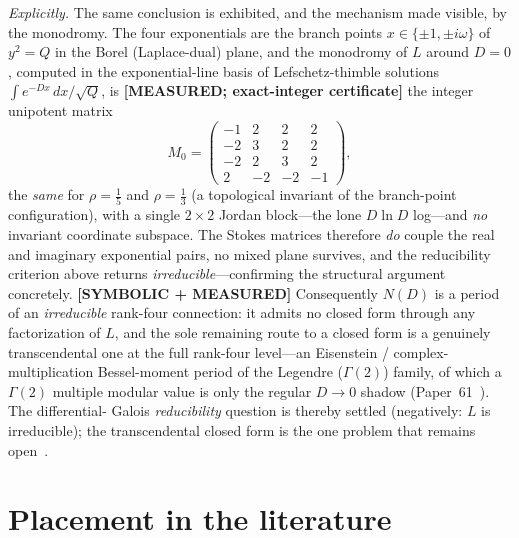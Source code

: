 \documentclass[aps,pra,twocolumn,superscriptaddress,longbibliography]{revtex4-2}
\begin{document}
\emph{Explicitly.}  The same conclusion is exhibited, and the mechanism made
visible, by the monodromy.  The four exponentials are the branch points
$x\in\{\pm1,\pm i\omega\}$ of $y^{2}=Q$ in the Borel (Laplace-dual) plane, and the
monodromy of $L$ around $D=0$, computed in the exponential-line basis of
Lefschetz-thimble solutions $\int e^{-Dx}\,dx/\sqrt{Q}$, is \textbf{[MEASURED;
exact-integer certificate]} the integer unipotent matrix
%
\begin{equation*}
  M_{0}=\begin{pmatrix}-1&2&2&2\\-2&3&2&2\\-2&2&3&2\\2&-2&-2&-1\end{pmatrix},
\end{equation*}
%
the \emph{same} for $\rho=\tfrac15$ and $\rho=\tfrac13$ (a topological invariant
of the branch-point configuration), with a single $2\times2$ Jordan block---the
lone $D\ln D$ log---and \emph{no} invariant coordinate subspace.  The Stokes
matrices therefore \emph{do} couple the real and imaginary exponential pairs, no
mixed plane survives, and the reducibility criterion above returns
\emph{irreducible}---confirming the structural argument concretely.
\textbf{[SYMBOLIC + MEASURED]} Consequently $N(D)$ is a period of an \emph{irreducible}
rank-four connection: it admits no closed form through any factorization of $L$,
and the sole remaining route to a closed form is a genuinely transcendental one at
the full rank-four level---an Eisenstein / complex-multiplication Bessel-moment
period of the Legendre ($\Gamma(2)$) family, of which a $\Gamma(2)$ multiple modular
value is only the regular $D\to0$ shadow (Paper~61~\cite{loutey_paper61}).  The differential-%
Galois \emph{reducibility} question is thereby settled (negatively: $L$ is
irreducible); the transcendental closed form is the one problem that remains
open~\cite{test_routeC}.

\section{Placement in the literature}
\label{sec:literature}
\end{document}
